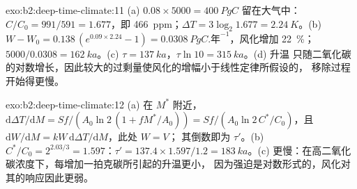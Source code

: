 \begin{solution}{exo:b2:deep-time-climate:11}
(a) $0.08\times5000 = \qty{400}{PgC}$ 留在大气中：$C/C_0 = 991/591 = 1.677$，即
\qty{466}{ppm}；$\Delta T = 3\log_2 1.677 = \qty{2.24}{K}$。(b) $W - W_0 = 0.138\,(e^{0.09\times2.24}
- 1) = \qty{0.0308}{PgC.\text{年}^{-1}}$，风化增加 \qty{22}{\percent}；$5000/0.0308 =
\qty{162}{ka}$。(c) $\tau = \qty{137}{ka}$，$\tau\ln10 = \qty{315}{ka}$。(d) 升温
只随二氧化碳的对数增长，因此较大的过剩量使风化的增幅小于线性定律所假设的，
移除过程开始得更慢。
\end{solution}

\begin{solution}{exo:b2:deep-time-climate:12}
(a) 在 $M^*$ 附近，$\mathrm d\Delta T/\mathrm dM = Sf/(A_0\ln 2\,(1 + fM^*/A_0)) = Sf/(A_0\ln 2\,
C^*/C_0)$，且 $\mathrm dW/\mathrm dM = kW\,\mathrm d\Delta T/\mathrm dM$，此处 $W = V$；
其倒数即为 $\tau'$。(b) $C^*/C_0 = 2^{2.03/3} = 1.597$：$\tau' = 137.4\times1.597/1.2 =
\qty{183}{ka}$。(c) 更慢：在高二氧化碳浓度下，每增加一拍克碳所引起的升温更小，
因为强迫是对数形式的，风化对其的响应因此更弱。
\end{solution}

